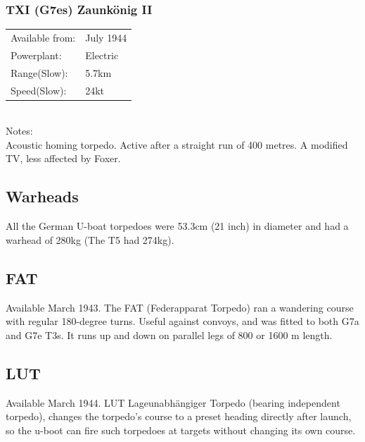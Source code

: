 \documentclass{article}
\begin{document}
\subsubsection{TXI (G7es) Zaunk\"onig II}
\begin{tabular}{l|l}
Available from:& July 1944\\
Powerplant:&Electric\\
Range(Slow):& 5.7km\\
Speed(Slow):& 24kt\\
\end{tabular} \\
Notes:\\
Acoustic homing torpedo. Active after a straight run of 400 metres. A modified TV, less affected by Foxer.

\subsection{Warheads}
All the German U-boat torpedoes were 53.3cm (21 inch) in diameter and had a warhead of 280kg (The T5 had 274kg).

\subsection{FAT}
Available March 1943. The FAT (Federapparat Torpedo) ran a wandering course with regular 180-degree turns. Useful against convoys, and was fitted to both G7a and G7e T3s. It runs up and down on parallel legs of 800 or 1600 m length.

\subsection{LUT}
Available March 1944. LUT Lageunabh\"angiger Torpedo (bearing independent torpedo), changes the torpedo's course to a preset heading directly after launch, so the u-boot can fire such torpedoes at targets without changing its own course.




\end{document}

